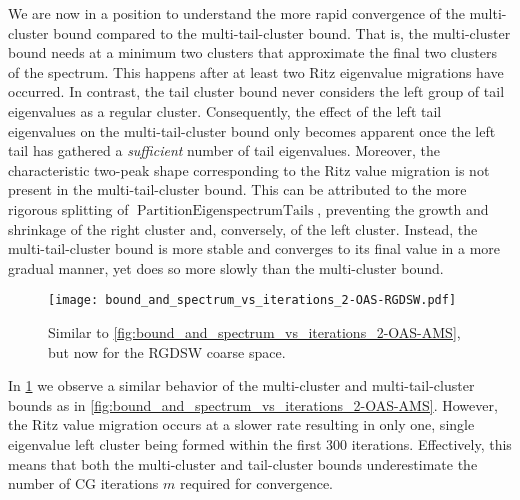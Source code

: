We are now in a position to understand the more rapid convergence of the multi-cluster bound compared to the multi-tail-cluster bound. That is, the multi-cluster bound needs at a minimum two clusters that approximate the final two clusters of the spectrum. This happens after at least two Ritz eigenvalue migrations have occurred. In contrast, the tail cluster bound never considers the left group of tail eigenvalues as a regular cluster. Consequently, the effect of the left tail eigenvalues on the multi-tail-cluster bound only becomes apparent once the left tail has gathered a \textit{sufficient} number of tail eigenvalues. Moreover, the characteristic two-peak shape corresponding to the Ritz value migration is not present in the multi-tail-cluster bound. This can be attributed to the more rigorous splitting of $\operatorname{PartitionEigenspectrumTails}$, preventing the growth and shrinkage of the right cluster and, conversely, of the left cluster. Instead, the multi-tail-cluster bound is more stable and converges to its final value in a more gradual manner, yet does so more slowly than the multi-cluster bound.
\begin{figure}[H]
    \centering
    \texttt{[image: bound\_and\_spectrum\_vs\_iterations\_2-OAS-RGDSW.pdf]}
    \caption{Similar to \cref{fig:bound_and_spectrum_vs_iterations_2-OAS-AMS}, but now for the RGDSW coarse space.}
    \label{fig:bound_and_spectrum_vs_iterations_2-OAS-RGDSW}
\end{figure}
In \cref{fig:bound_and_spectrum_vs_iterations_2-OAS-RGDSW} we observe a similar behavior of the multi-cluster and multi-tail-cluster bounds as in \cref{fig:bound_and_spectrum_vs_iterations_2-OAS-AMS}. However, the Ritz value migration occurs at a slower rate resulting in only one, single eigenvalue left cluster being formed within the first 300 iterations. Effectively, this means that both the multi-cluster and tail-cluster bounds underestimate the number of CG iterations $m$ required for convergence.

